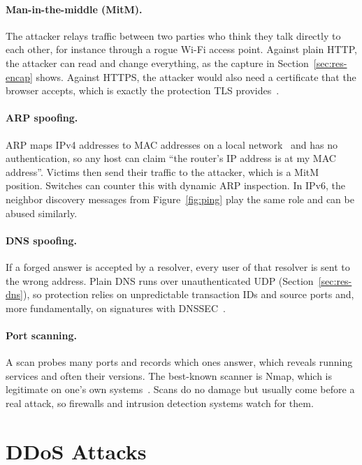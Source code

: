\paragraph{Man-in-the-middle (MitM).} The attacker relays traffic between two parties who think they talk directly to each other, for instance through a rogue Wi-Fi access point. Against plain HTTP, the attacker can read and change everything, as the capture in Section~\ref{sec:res-encap} shows. Against HTTPS, the attacker would also need a certificate that the browser accepts, which is exactly the protection TLS provides~\cite{rfc8446}.

\paragraph{ARP spoofing.} ARP maps IPv4 addresses to MAC addresses on a local network~\cite{rfc826} and has no authentication, so any host can claim \enquote{the router's IP address is at my MAC address}. Victims then send their traffic to the attacker, which is a MitM position. Switches can counter this with dynamic ARP inspection. In IPv6, the neighbor discovery messages from Figure~\ref{fig:ping} play the same role and can be abused similarly.

\paragraph{DNS spoofing.} If a forged answer is accepted by a resolver, every user of that resolver is sent to the wrong address. Plain DNS runs over unauthenticated UDP (Section~\ref{sec:res-dns}), so protection relies on unpredictable transaction IDs and source ports and, more fundamentally, on signatures with DNSSEC~\cite{rfc4033}.

\paragraph{Port scanning.} A scan probes many ports and records which ones answer, which reveals running services and often their versions. The best-known scanner is Nmap, which is legitimate on one's own systems~\cite{nmap}. Scans do no damage but usually come before a real attack, so firewalls and intrusion detection systems watch for them.

\section{DDoS Attacks}\label{sec:ddos}

